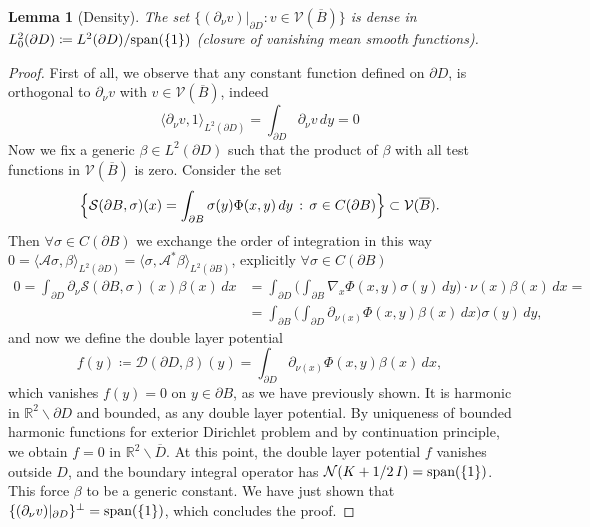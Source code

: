 \documentclass[10pt, a4paper, twoside, openright]{book}
\theoremstyle{definition}
\theoremstyle{plain}
\theoremstyle{plain}
\theoremstyle{plain}
\theoremstyle{plain}
\theoremstyle{plain}
\newtheorem{lemma}[subsection]{Lemma}
\theoremstyle{plain}
\theoremstyle{plain}
\theoremstyle{plain}
\begin{document}
\begin{lemma}[Density]
\label{lemma:density-V-1}
 The set $\{(\partial_\nu v )|_{\partial D}:v\in \mathcal{V}(\overline{B})\}$ is dense in $L^2_0(\partial D)\coloneqq L^2(\partial D)/\textup{span}(\{1\})$ (closure of vanishing mean smooth functions).
\end{lemma}
\begin{proof}
 First of all, we observe that any constant function defined on $\partial D$, is orthogonal 
 to $\partial_\nu v$ with $v\in\mathcal{V}(\overline{B})$, indeed
 \begin{equation*}
  \langle \partial_\nu v, 1\rangle_{L^2(\partial D)} = \int_{\partial D}\partial_\nu v\,dy=0
 \end{equation*}
 Now we fix a generic $\beta\in L^2(\partial D)$ such that the product of $\beta$ with all test functions in $\mathcal{V}(\overline{B})$ is zero. 
 Consider the set
 \begin{equation}
  \Bigl\{\mathcal{S}(\partial B, \sigma)(x) = \int_{\partial B} \sigma(y)\Phi(x,y)\,dy\,:\, \sigma \in C(\partial B)\Bigr\} \subset \mathcal{V}(\overline{B}).
 \end{equation}
 Then $\forall\sigma\in C(\partial B)$ we exchange the order of integration in this way $0=\langle\mathcal{A}\sigma,\beta\rangle_{L^2(\partial D)} =\langle\sigma,\mathcal{A}^*\beta\rangle_{L^2(\partial B)}$, explicitly $\forall\sigma\in C(\partial B)$
 \begin{align*}
  0 = \int_{\partial D}\partial_\nu \mathcal{S}(\partial B, \sigma)(x) \beta(x) \, dx &= \int_{\partial D}\Big( \int_{\partial B}\nabla_x \Phi(x,y) \sigma(y)\,dy\Big)\cdot\nu(x)\beta(x) \, dx = \\
   &= \int_{\partial B}\Big( \int_{\partial D}\partial_{\nu(x)} \Phi(x,y) \beta(x)\,dx\Big)\sigma(y) \, dy,
 \end{align*}
 and now we define the double layer potential
 \begin{equation}
  f(y)\coloneqq \mathcal{D}(\partial D, \beta)(y)=\int_{\partial D}\partial_{\nu(x)} \Phi(x,y) \beta(x)\,dx,
 \end{equation}
 which vanishes $f(y)=0$ on $y\in\partial B$, as we have previously shown.
 It is harmonic in $\mathbb{R}^2\backslash\partial D$ and bounded, as any double layer potential. 
 By uniqueness of bounded harmonic functions for exterior Dirichlet problem and by continuation principle, we obtain $f=0$ in $\mathbb{R}^2\backslash\overline{D}$. At this point, the double layer potential $f$ vanishes outside $D$, and the boundary integral operator has $\mathcal{N}(K+1/2\,I)=\textup{span}(\{1\})$. This force $\beta$ to be a generic constant. 
 We have just shown that $\{(\partial_\nu v )|_{\partial D}\}^\perp = \textup{span}(\{1\})$, 
 which concludes the proof.
\end{proof}
\end{document}

